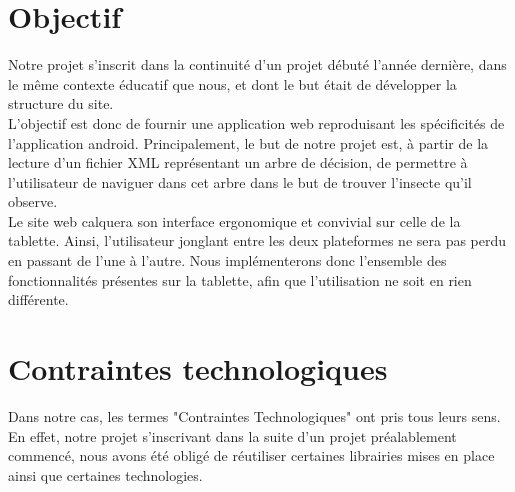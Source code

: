 \documentclass[twoside]{EPURapport}
\begin{document}
	\section{Objectif}
	
	Notre projet s'inscrit dans la continuité d'un projet débuté l'année dernière, dans le même contexte éducatif que nous, et dont le but était de développer la structure du site.\\
	
	L'objectif est donc de fournir une application web reproduisant les spécificités de l'application android. Principalement, le but de notre projet est, à partir de la lecture d'un fichier XML représentant un arbre de décision, de permettre à l'utilisateur  de naviguer dans cet arbre dans le but de trouver l'insecte qu'il observe.\\
	
	Le site web calquera son interface ergonomique et convivial sur celle de la tablette. Ainsi, l'utilisateur jonglant entre les deux plateformes ne sera pas perdu en passant de l'une à l'autre. Nous implémenterons donc l'ensemble des fonctionnalités présentes sur la tablette, afin que l'utilisation ne soit en rien différente.

	\section{Contraintes technologiques}
	
	Dans notre cas, les termes "Contraintes Technologiques" ont pris tous leurs sens. En effet, notre projet s'inscrivant dans la suite d'un projet préalablement commencé, nous avons été obligé de réutiliser certaines librairies mises en place ainsi que certaines technologies.\\
	
\end{document}
